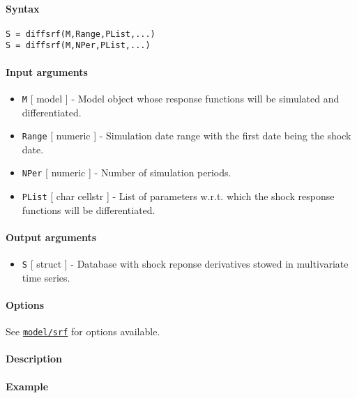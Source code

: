 


	\paragraph{Syntax}

\begin{verbatim}
S = diffsrf(M,Range,PList,...)
S = diffsrf(M,NPer,PList,...)
\end{verbatim}

\paragraph{Input arguments}

\begin{itemize}
\item
  \texttt{M} {[} model {]} - Model object whose response functions will
  be simulated and differentiated.
\item
  \texttt{Range} {[} numeric {]} - Simulation date range with the first
  date being the shock date.
\item
  \texttt{NPer} {[} numeric {]} - Number of simulation periods.
\item
  \texttt{PList} {[} char \textbar{} cellstr {]} - List of parameters
  w.r.t. which the shock response functions will be differentiated.
\end{itemize}

\paragraph{Output arguments}

\begin{itemize}
\itemsep1pt\parskip0pt
\item
  \texttt{S} {[} struct {]} - Database with shock reponse derivatives
  stowed in multivariate time series.
\end{itemize}

\paragraph{Options}

See \href{model/srf}{\texttt{model/srf}} for options available.

\paragraph{Description}

\paragraph{Example}


